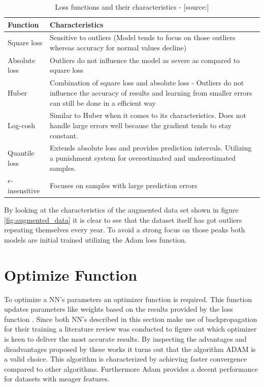 \begin{table}[htbp]
	\centering
		\begin{tabularx}{\textwidth}{|l|X|}
		\hline
		\rowcolor[gray]{0.9}
		Function & Characteristics \\
		\hline
		Square loss &Sensitive to outliers (Model tends to focus on those outliers whereas accuracy for normal values decline)\\
		 \hline
		Absolute loss & Outliers do not influence the model as severe as compared to square loss  \\
		Huber & Combination of square loss and absolute loss - Outliers do not influence the accuracy of results and learning from smaller errors can still be done in a efficient way  \\
		\hline
		Log-cosh & Similar to Huber when it comes to its characteristics. Does not handle large errors well because the gradient tends to stay constant. \\
		\hline
		Quantile loss & Extends absolute loss and provides prediction intervals. Utilizing a punishment system for overestimated and underestimated samples. \\
		\hline
		$\epsilon$-insensitive & Focuses on samples with large prediction errors \\
		\hline	
		\end{tabularx}
	\caption{Loss functions and their characteristics - [source:\cite{loss_func}]}
	\label{tab:loss_function}
\end{table}

By looking at the characteristics of the augmented data set shown in figure \ref{fig:augmented_data} it is clear to see that the dataset itself has got outliers repeating themselves every year. To avoid a strong focus on those peaks both models are initial trained utilizing the Adam loss function.

\section{Optimize Function}
\label{sec:optimize_func}
To optimize a NN's parameters an optimizer function is required. This function updates parameters like weights based on the results provided by the loss function \cite{optimizer}. Since both NN's described in this section make use of backpropagation for their training a literature review was conducted to figure out which optimizer is keen to deliver the most accurate results. By inspecting the advantages and disadvantages proposed by these works \cite{optimizer}\cite{optimizer_1}\cite{optimizer_2} it turns out that the algorithm ADAM is a valid choice. This algorithm is characterized by achieving faster convergence compared to other algorithms. Furthermore Adam provides a decent performance for datasets with meager features.

